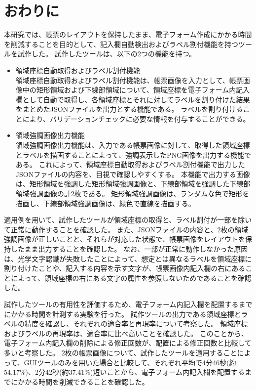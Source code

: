 \chapter{おわりに}\label{cha:Conclusion}
本研究では、帳票のレイアウトを保持したまま、電子フォーム作成にかかる時間を削減することを目的として、記入欄自動検出およびラベル割付機能を持つツールを試作した。
試作したツールは、以下の2つの機能を持つ。

\begin{itemize}
  \item 領域座標自動取得およびラベル割付機能\\
      領域座標自動取得およびラベル割付機能は、帳票画像を入力として、帳票画像中の矩形領域および下線部領域について、領域座標を電子フォーム内記入欄として自動で取得し、各領域座標とそれに対してラベルを割り付けた結果をまとめたJSONファイルを出力とする機能である。
      ラベルを割り付けることにより、バリデーションチェックに必要な情報を付与することができる。
  \item 領域強調画像出力機能\\
      領域強調画像出力機能は、入力である帳票画像に対して、取得した領域座標とラベルを描画することによって、強調表示したPNG画像を出力する機能である。
      これによって、領域座標自動取得およびラベル割付機能で出力したJSONファイルの内容を、目視で確認しやすくする。
      本機能で出力する画像は、矩形領域を強調した矩形領域強調画像と、下線部領域を強調した下線部領域強調画像の計2枚である。
      矩形領域強調画像は、ランダムな色で矩形を描画し、下線部領域強調画像は、緑色で直線を描画する。
\end{itemize}

適用例を用いて、試作したツールが領域座標の取得と、ラベル割付が一部を除いて正常に動作することを確認した。
また、JSONファイルの内容と、2枚の領域強調画像が正しいことと、それらが対応した状態で、帳票画像をレイアウトを保持したまま出力することを確認した。
なお、一部が正常に動作しなかった原因は、光学文字認識が失敗したことによって、想定とは異なるラベルを領域座標に割り付けたことや、記入する内容を示す文字が、帳票画像内記入欄の右にあることによって、領域座標の右にある文字の属性を参照しないためであることを確認した。

試作したツールの有用性を評価するため、電子フォーム内記入欄を配置するまでにかかる時間を計測する実験を行った。
試作ツールの出力である領域座標とラベルの精度を確認し、それぞれの適合率と再現率について考察した。
領域座標およびラベルの再現率は、適合率に比べ高いことを確認した。
このことから、電子フォーム内記入欄の削除による修正回数が、配置による修正回数と比較して多いと考察した。
2枚の帳票画像について、試作したツールを適用することによって、GUIツールのみを用いた場合と比較して、それぞれ平均で4分46秒(約54.17\%)、2分42秒(約37.41\%)短いことから、電子フォーム内記入欄を配置するまでにかかる時間を削減できることを確認した。

